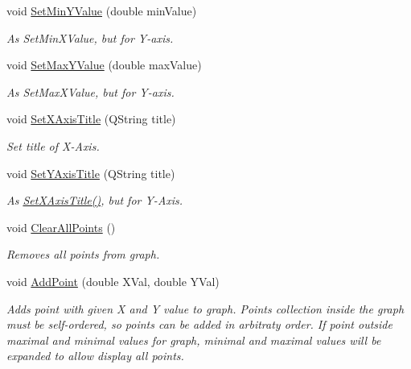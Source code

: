 \begin{DoxyCompactItemize}
void \hyperlink{class_fossa_1_1_q_simple_graph_1_1_q_simple_graph_a8bf9aac5856a659eb89abffca7750df0}{Set\+Min\+Y\+Value} (double min\+Value)
\begin{DoxyCompactList}\small\item\em As Set\+Min\+X\+Value, but for Y-\/axis. \end{DoxyCompactList}\item 
void \hyperlink{class_fossa_1_1_q_simple_graph_1_1_q_simple_graph_a6cb6eee80dc489f300e32263833cf1cd}{Set\+Max\+Y\+Value} (double max\+Value)
\begin{DoxyCompactList}\small\item\em As Set\+Max\+X\+Value, but for Y-\/axis. \end{DoxyCompactList}\item 
void \hyperlink{class_fossa_1_1_q_simple_graph_1_1_q_simple_graph_a7579da572b54d43ccec3d2bd572b6cfa}{Set\+X\+Axis\+Title} (Q\+String title)
\begin{DoxyCompactList}\small\item\em Set title of X-\/\+Axis. \end{DoxyCompactList}\item 
void \hyperlink{class_fossa_1_1_q_simple_graph_1_1_q_simple_graph_a41c9e9d34744f6e6550ca97dc0d2f488}{Set\+Y\+Axis\+Title} (Q\+String title)
\begin{DoxyCompactList}\small\item\em As \hyperlink{class_fossa_1_1_q_simple_graph_1_1_q_simple_graph_a7579da572b54d43ccec3d2bd572b6cfa}{Set\+X\+Axis\+Title()}, but for Y-\/\+Axis. \end{DoxyCompactList}\item 
\mbox{\label{class_fossa_1_1_q_simple_graph_1_1_q_simple_graph_a96233ee152a35d27d6b0a66712f52011}} 
void \hyperlink{class_fossa_1_1_q_simple_graph_1_1_q_simple_graph_a96233ee152a35d27d6b0a66712f52011}{Clear\+All\+Points} ()
\begin{DoxyCompactList}\small\item\em Removes all points from graph. \end{DoxyCompactList}\item 
void \hyperlink{class_fossa_1_1_q_simple_graph_1_1_q_simple_graph_a39fdbd2aa624b7b086b5761308d8d49c}{Add\+Point} (double X\+Val, double Y\+Val)
\begin{DoxyCompactList}\small\item\em Adds point with given X and Y value to graph. Points collection inside the graph must be self-\/ordered, so points can be added in arbitraty order. If point outside maximal and minimal values for graph, minimal and maximal values will be expanded to allow display all points. \end{DoxyCompactList}\end{DoxyCompactItemize}
